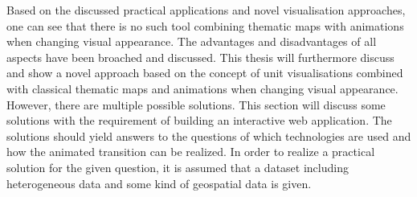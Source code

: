 Based on the discussed practical applications and novel visualisation approaches, one can see that there is no such tool combining thematic maps with animations when changing visual appearance. The advantages and disadvantages of all aspects have been broached and discussed. This thesis will furthermore discuss and show a novel approach based on the concept of unit visualisations combined with classical thematic maps and animations when changing visual appearance. However, there are multiple possible solutions. This section will discuss some solutions with the requirement of building an interactive web application. The solutions should yield answers to the questions of which technologies are used and how the animated transition can be realized.
In order to realize a practical solution for the given question, it is assumed that a dataset including heterogeneous data and some kind of geospatial data is given.

